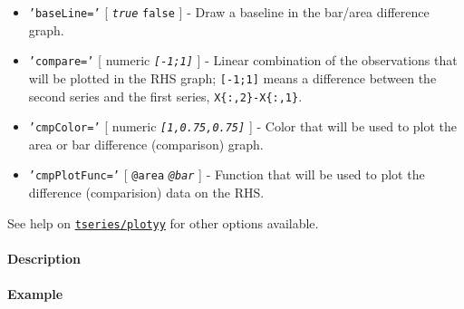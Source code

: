 \begin{itemize}
\item
  \texttt{'baseLine='} {[} \emph{\texttt{true}} \textbar{}
  \texttt{false} {]} - Draw a baseline in the bar/area difference graph.
\item
  \texttt{'compare='} {[} numeric \textbar{} \emph{\texttt{{[}-1;1{]}}}
  {]} - Linear combination of the observations that will be plotted in
  the RHS graph; \texttt{{[}-1;1{]}} means a difference between the
  second series and the first series, \texttt{X\{:,2\}-X\{:,1\}}.
\item
  \texttt{'cmpColor='} {[} numeric \textbar{}
  \emph{\texttt{{[}1,0.75,0.75{]}}} {]} - Color that will be used to
  plot the area or bar difference (comparison) graph.
\item
  \texttt{'cmpPlotFunc='} {[} \texttt{@area} \textbar{}
  \emph{\texttt{@bar}} {]} - Function that will be used to plot the
  difference (comparision) data on the RHS.
\end{itemize}

See help on \href{tseries/plotyy}{\texttt{tseries/plotyy}} for other
options available.

\paragraph{Description}

\paragraph{Example}


